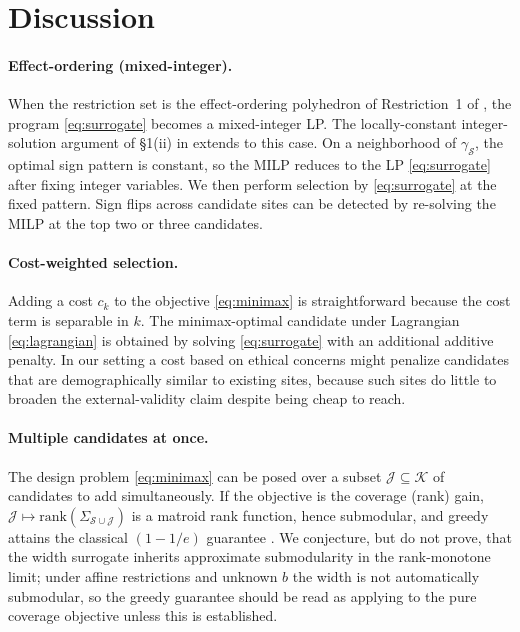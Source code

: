 \section{Discussion}
\label{sec:extensions}

\paragraph{Effect-ordering (mixed-integer).}
When the restriction set is the effect-ordering polyhedron of Restriction~1 of \citet{boyarsky2026}, the program \eqref{eq:surrogate} becomes a mixed-integer
LP. The locally-constant integer-solution argument of \S1(ii) in \citet{boyarsky2026} extends to this case. On a neighborhood of $\gamma_\mathcal{S}$, the
optimal sign pattern is constant, so the MILP reduces to the LP
\eqref{eq:surrogate} after fixing integer variables. We then perform selection
by \eqref{eq:surrogate} at the fixed pattern. Sign flips across candidate sites
can be detected by re-solving the MILP at the top two or three candidates.

\paragraph{Cost-weighted selection.}
Adding a cost $c_k$ to the objective \eqref{eq:minimax} is straightforward
because the cost term is separable in $k$. The minimax-optimal candidate under
Lagrangian \eqref{eq:lagrangian} is obtained by solving \eqref{eq:surrogate}
with an additional additive penalty. In our setting a cost based on ethical
concerns might penalize candidates that are demographically similar to existing
sites, because such sites do little to broaden the external-validity claim
despite being cheap to reach.

\paragraph{Multiple candidates at once.}
The design problem \eqref{eq:minimax} can be posed over a subset
$\mathcal{J}\subseteq\mathcal{K}$ of candidates to add simultaneously. If the
objective is the coverage (rank) gain, $\mathcal{J}\mapsto
\mathrm{rank}(\Sigma_{\mathcal{S}\cup\mathcal{J}})$ is a matroid rank function,
hence submodular, and greedy attains the classical $(1-1/e)$ guarantee
\citep{nemhauser1978analysis}. We conjecture, but do not prove, that the
width surrogate inherits approximate submodularity in the rank-monotone
limit; under affine restrictions and unknown $b$ the width is not automatically
submodular, so the greedy guarantee should be read as applying to the pure
coverage objective unless this is established.

